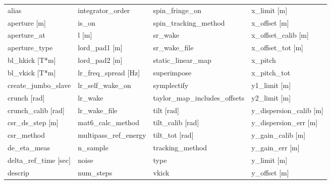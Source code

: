  \begin{tabular}{llll} \toprule
alias                            & integrator_order                 & spin_fringe_on                   & x_limit [m]                      \\
aperture [m]                     & is_on                            & spin_tracking_method             & x_offset [m]                     \\
aperture_at                      & l [m]                            & sr_wake                          & x_offset_calib [m]               \\
aperture_type                    & lord_pad1 [m]                    & sr_wake_file                     & x_offset_tot [m]                 \\
bl_hkick [T*m]                   & lord_pad2 [m]                    & static_linear_map                & x_pitch                          \\
bl_vkick [T*m]                   & lr_freq_spread [Hz]              & superimpose                      & x_pitch_tot                      \\
create_jumbo_slave               & lr_self_wake_on                  & symplectify                      & y1_limit [m]                     \\
crunch [rad]                     & lr_wake                          & taylor_map_includes_offsets      & y2_limit [m]                     \\
crunch_calib [rad]               & lr_wake_file                     & tilt [rad]                       & y_dispersion_calib [m]           \\
csr_ds_step [m]                  & mat6_calc_method                 & tilt_calib [rad]                 & y_dispersion_err [m]             \\
csr_method                       & multipass_ref_energy             & tilt_tot [rad]                   & y_gain_calib [m]                 \\
de_eta_meas                      & n_sample                         & tracking_method                  & y_gain_err [m]                   \\
delta_ref_time [sec]             & noise                            & type                             & y_limit [m]                      \\
descrip                          & num_steps                        & vkick                            & y_offset [m]                     \\

\end{tabular}
